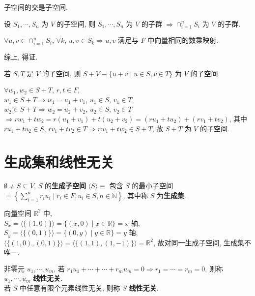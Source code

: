 \documentclass{note}
\begin{document}
子空间的交是子空间.
\begin{pf}
    设 $S_1,\cdots,S_n$ 为 $V$ 的子空间, 则 $S_1,\cdots,S_n$ 为 $V$ 的子群 $\Longrightarrow\cap_{i=1}^nS_i$ 为 $V$ 的子群.

    $\forall u,v\in\cap_{i=1}^nS_i$, $\forall k$, $u,v\in S_k\Longrightarrow u,v$ 满足与 $F$ 中向量相同的数乘映射.

    综上, 得证.
\end{pf}

若 $S,T$ 是 $V$ 的子空间, 则 $S+V\equiv\{u+v\mid u\in S,v\in T\}$ 为 $V$ 的子空间.
\begin{pf}
    $\forall w_1,w_2\in S+T$, $r,t\in F$,\\
    $w_1\in S+T\Longrightarrow w_1=u_1+v_1$, $u_1\in S$, $v_1\in T$,\\
    $w_2\in S+T\Longrightarrow w_2=u_2+v_2$, $u_2\in S$, $v_2\in T$\\
    $\Longrightarrow rw_1+tw_2=r(u_1+v_1)+t(u_2+v_2)=(ru_1+tu_2)+(rv_1+tv_2)$, 其中 $ru_1+tu_2\in S$, $rv_1+tv_2\in T\Longrightarrow rw_1+tw_2\in S+T$, 故 $S+T$ 为 $V$ 的子空间.
\end{pf}

\section{生成集和线性无关}
\begin{df}[生成子空间和生成集]
    $\emptyset\neq S\subseteq V$, $S$ 的\textbf{生成子空间} $\langle S\rangle\equiv$ 包含 $S$ 的最小子空间 $=\left\{\sum_{i=1}^nr_iu_i\mid r_i\in F,u_i\in S,n\in\mathbb{N}\right\}$, 其中称 $S$ 为\textbf{生成集}.
\end{df}

\begin{eg}
    向量空间 $\mathbb{R}^2$ 中,\\
    $S_x=\langle\{(1,0)\}\rangle=\{(x,0)\mid x\in\mathbb{R}\}=x$ 轴,\\
    $S_y=\langle\{(0,1)\}\rangle=\{(0,y)\mid y\in\mathbb{R}\}=y$ 轴,\\
    $\langle\{(1,0),(0,1)\}\rangle=\langle\{(1,1),(1,-1)\}\rangle=\mathbb{R}^2$, 故对同一生成子空间, 生成集不唯一.
\end{eg}

\begin{df}[线性无关]
    非零元 $u_1,\cdots,u_m$, 若 $r_1u_1+\cdots+\cdots+r_mu_m=0\Longrightarrow r_1=\cdots=r_m=0$, 则称 $u_1,\cdots,u_m$ \textbf{线性无关}.\\
    若 $S$ 中任意有限个元素线性无关, 则称 $S$ \textbf{线性无关}.
\end{df}
\end{document}
